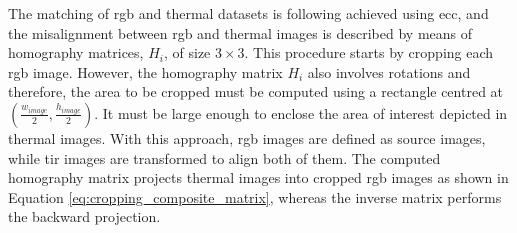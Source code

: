The matching of \acrshort{rgb} and thermal datasets is following achieved using \acrshort{ecc}, and the misalignment between \acrshort{rgb} and thermal images is described by means of homography matrices, $H_i$, of size $3\times3$. This procedure starts by cropping each \acrshort{rgb} image. However, the homography matrix $H_i$ also involves rotations and therefore, the area to be cropped must be computed using a rectangle centred at $(\frac{w_{\textit{image}}}{2}, \frac{h_{\textit{image}}}{2})$. It must be large enough to enclose the area of interest depicted in thermal images. With this approach, \acrshort{rgb} images are defined as source images, while \acrshort{tir} images are transformed to align both of them. The computed homography matrix projects thermal images into cropped \acrshort{rgb} images as shown in Equation \ref{eq:cropping_composite_matrix}, whereas the inverse matrix performs the backward projection. 

